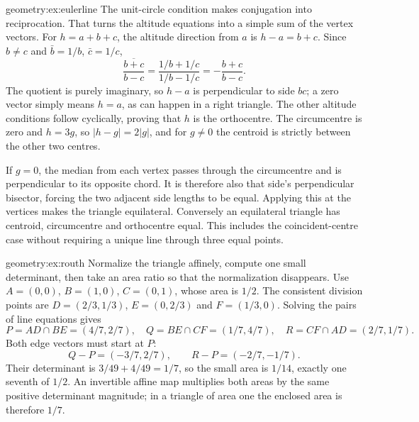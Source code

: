 \begin{solution}{geometry:ex:eulerline}
\idea The unit-circle condition makes conjugation into reciprocation. That turns the altitude equations into a simple sum of the vertex vectors.
\writeup For $h=a+b+c$, the altitude direction from $a$ is $h-a=b+c$. Since $b\ne c$ and $\bar b=1/b$, $\bar c=1/c$,
\[
\overline{\frac{b+c}{b-c}}=
\frac{1/b+1/c}{1/b-1/c}=-\frac{b+c}{b-c}.
\]
The quotient is purely imaginary, so $h-a$ is perpendicular to side $bc$; a zero vector simply means $h=a$, as can happen in a right triangle. The other altitude conditions follow cyclically, proving that $h$ is the orthocentre. The circumcentre is zero and $h=3g$, so $|h-g|=2|g|$, and for $g\ne0$ the centroid is strictly between the other two centres.

If $g=0$, the median from each vertex passes through the circumcentre and is perpendicular to its opposite chord. It is therefore also that side's perpendicular bisector, forcing the two adjacent side lengths to be equal. Applying this at the vertices makes the triangle equilateral. Conversely an equilateral triangle has centroid, circumcentre and orthocentre equal. This includes the coincident-centre case without requiring a unique line through three equal points.
\end{solution}

\begin{solution}{geometry:ex:routh}
\idea Normalize the triangle affinely, compute one small determinant, then take an area ratio so that the normalization disappears.
\writeup Use $A=(0,0)$, $B=(1,0)$, $C=(0,1)$, whose area is $1/2$. The consistent division points are $D=(2/3,1/3)$, $E=(0,2/3)$ and $F=(1/3,0)$. Solving the pairs of line equations gives
\[
P=AD\cap BE=(4/7,2/7),\quad
Q=BE\cap CF=(1/7,4/7),\quad
R=CF\cap AD=(2/7,1/7).
\]
Both edge vectors must start at $P$:
\[
Q-P=(-3/7,2/7),\qquad R-P=(-2/7,-1/7).
\]
Their determinant is $3/49+4/49=1/7$, so the small area is $1/14$, exactly one seventh of $1/2$. An invertible affine map multiplies both areas by the same positive determinant magnitude; in a triangle of area one the enclosed area is therefore $1/7$.
\end{solution}

